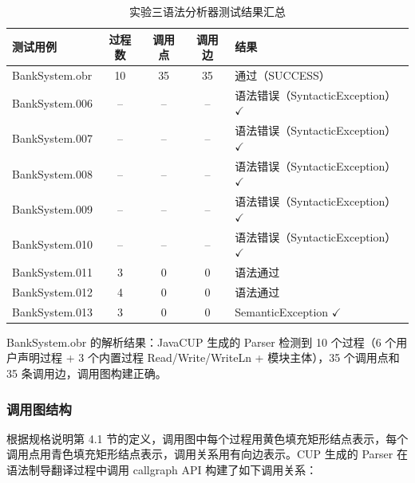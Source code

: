 \begin{table}[htbp]
    \centering
    \begin{tabular}{|l|c|c|c|l|}
    \hline
    \textbf{测试用例} & \textbf{过程数} & \textbf{调用点} & \textbf{调用边} & \textbf{结果} \\
    \hline
    BankSystem.obr & 10 & 35 & 35 & 通过（SUCCESS）\\
    BankSystem.006 & -- & -- & -- & 语法错误（SyntacticException）$\checkmark$ \\
    BankSystem.007 & -- & -- & -- & 语法错误（SyntacticException）$\checkmark$ \\
    BankSystem.008 & -- & -- & -- & 语法错误（SyntacticException）$\checkmark$ \\
    BankSystem.009 & -- & -- & -- & 语法错误（SyntacticException）$\checkmark$ \\
    BankSystem.010 & -- & -- & -- & 语法错误（SyntacticException）$\checkmark$ \\
    BankSystem.011 & 3 & 0 & 0 & 语法通过 \\
    BankSystem.012 & 4 & 0 & 0 & 语法通过 \\
    BankSystem.013 & 3 & 0 & 0 & SemanticException $\checkmark$ \\
    \hline
    \end{tabular}
    \caption{实验三语法分析器测试结果汇总}
    \label{tab:parser3-results}
\end{table}

BankSystem.obr 的解析结果：JavaCUP 生成的 Parser 检测到 10 个过程（6 个用户声明过程 + 3 个内置过程 Read/Write/WriteLn + 模块主体），35 个调用点和 35 条调用边，调用图构建正确。

\subsubsection{调用图结构}

根据规格说明第 4.1 节的定义，调用图中每个过程用黄色填充矩形结点表示，每个调用点用青色填充矩形结点表示，调用关系用有向边表示。CUP 生成的 Parser 在语法制导翻译过程中调用 callgraph API 构建了如下调用关系：

